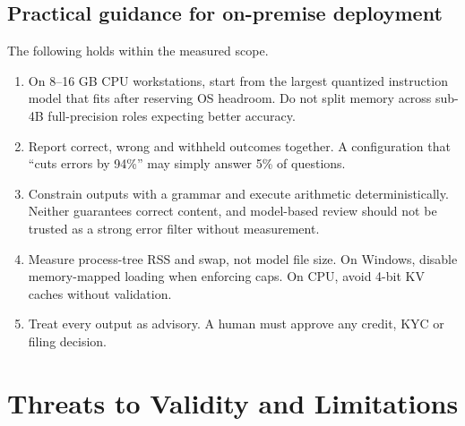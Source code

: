 \documentclass[letterpaper]{article}
\providecommand{\tightlist}{}
\begin{document}
\subsection{Practical guidance for on-premise deployment}\label{practical-guidance-for-on-premise-deployment}

The following holds within the measured scope.

\begin{enumerate}
\def\labelenumi{\arabic{enumi}.}
\tightlist
\item
  On 8--16 GB CPU workstations, start from the largest quantized instruction model that fits after reserving OS headroom. Do not split memory across sub-4B full-precision roles expecting better accuracy.
\item
  Report correct, wrong and withheld outcomes together. A configuration that ``cuts errors by 94\%'' may simply answer 5\% of questions.
\item
  Constrain outputs with a grammar and execute arithmetic deterministically. Neither guarantees correct content, and model-based review should not be trusted as a strong error filter without measurement.
\item
  Measure process-tree RSS and swap, not model file size. On Windows, disable memory-mapped loading when enforcing caps. On CPU, avoid 4-bit KV caches without validation.
\item
  Treat every output as advisory. A human must approve any credit, KYC or filing decision.
\end{enumerate}

\section{Threats to Validity and Limitations}\label{threats-to-validity-and-limitations}
\end{document}
